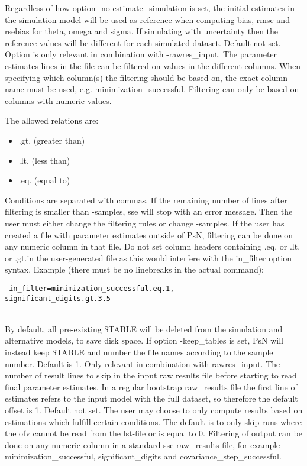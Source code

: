 \begin{optionlist}
Regardless of how option -no-estimate\_simulation is set, the initial estimates in the simulation model will be used as reference when computing bias, rmse and rsebias for theta, omega and sigma. If simulating with uncertainty then the reference values will be different for each simulated dataset. 
\nextopt
{}
Default not set. Option is only relevant in combination with -rawres\_input. The parameter estimates lines in the file can be filtered on values in the different columns. When specifying which column(s) the filtering should be based on, the exact column name must be used, e.g. minimization\_successful. Filtering can only be based on columns with numeric values. 

The allowed relations are:
\begin{itemize}
	\item .gt. (greater than)
	\item .lt. (less than)
	\item .eq. (equal to)
\end{itemize}
Conditions are separated with commas. If the remaining number of lines after filtering is smaller than -samples,  sse will stop with an error message. Then the user must either change the filtering rules or change -samples. If the user has created a file with parameter estimates outside of PsN, filtering can be done on any numeric column in that file. Do not set column headers containing .eq. or .lt. or .gt.in the user-generated file as this would interfere with the in\_filter option syntax.
\newpage
Example (there must be no linebreaks in the actual command):
\begin{verbatim}
-in_filter=minimization_successful.eq.1,
significant_digits.gt.3.5
\end{verbatim} \\
\nextopt
{}
By default, all pre-existing \$TABLE will be deleted from the simulation and alternative models, to save disk space. If option -keep\_tables is set, 
PsN will instead keep \$TABLE and number the file names according to the sample number.
\nextopt
{}
Default is 1. Only relevant in combination with rawres\_input. The number of result lines to skip in the input raw results file before starting to read final parameter estimates. In a regular bootstrap raw\_results file the first line of estimates refers to the input model with the full dataset, so therefore the default offset is 1.
\nextopt
{}
Default not set. The user may choose to only compute results based on estimations which fulfill certain conditions. The default is to only skip runs where the ofv cannot be read from the lst-file or is equal to 0. Filtering of output can be done on any numeric column in a standard sse raw\_results file, for example minimization\_successful, significant\_digits 
and covariance\_step\_successful. 


\end{optionlist}
